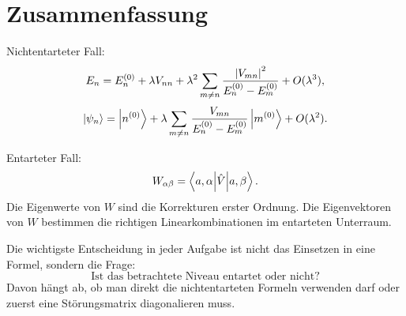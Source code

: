 \section{Zusammenfassung}

\begin{formulabox}
Nichtentarteter Fall:
\[
    E_n=E_n^{(0)}+\lambda V_{nn}
    +\lambda^2\sum_{m\neq n}\frac{\left| V_{mn} \right|^2}{E_n^{(0)}-E_m^{(0)}}+O(\lambda^3),
\]
\[
    \left|\psi_n\right\rangle=\left|n^{(0)}\right\rangle
    +\lambda\sum_{m\neq n}\frac{V_{mn}}{E_n^{(0)}-E_m^{(0)}}\left|m^{(0)}\right\rangle+O(\lambda^2).
\]
\end{formulabox}

\begin{formulabox}
Entarteter Fall:
\[
    W_{\alpha\beta}=\left\langle a,\alpha\middle|\hat V\middle|a,\beta\right\rangle.
\]
Die Eigenwerte von \(W\) sind die Korrekturen erster Ordnung. Die Eigenvektoren von \(W\) bestimmen die richtigen Linearkombinationen im entarteten Unterraum.
\end{formulabox}

\begin{conceptbox}
Die wichtigste Entscheidung in jeder Aufgabe ist nicht das Einsetzen in eine Formel, sondern die Frage:
\[
    \text{Ist das betrachtete Niveau entartet oder nicht?}
\]
Davon hängt ab, ob man direkt die nichtentarteten Formeln verwenden darf oder zuerst eine Störungsmatrix diagonalieren muss.
\end{conceptbox}

